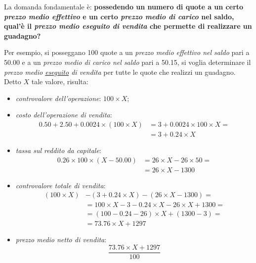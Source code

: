 \documentclass[12pt,a4paper]{article}
\newcommand{\Eur}[1]{\SI{#1}{\text{\euro{}}}}
\begin{document}

La domanda  fondamentale è:  \textbf{possedendo un  numero di  quote a  un certo  \emph{prezzo medio
      effettivo} e un  certo \emph{prezzo medio di  carico} nel saldo, qual'è  il \emph{prezzo medio
      eseguito di vendita} che permette di realizzare un guadagno?}

Per esempio,  si posseggano  \num{100} quote  a un \emph{prezzo  medio effettivo  nel saldo}  pari a
\Eur{50,00} e a un \emph{prezzo medio di carico nel saldo} pari a \Eur{50,15}, si voglia determinare
il \emph{prezzo medio \underline{eseguito} di vendita} per  tutte le quote che realizzi un guadagno.
Detto \(X\) tale valore, risulta:
\begin{itemize}
\item \emph{controvalore dell'operazione}: \(\num{100} \times{} X\);
\item \emph{costo dell'operazione di vendita}:
  \begin{align*}
    \num{0,50} + \num{2,50} + \num{0,0024} \times{} (\num{100} \times{} X)
    &= \num{3} + \num{0,0024} \times{} \num{100} \times{} X = \\
    &= \num{3} + \num{0,24} \times{} X
  \end{align*}
\item \emph{tassa sul reddito da capitale}:
  \begin{align*}
    \num{0,26} \times{} \num{100} \times{} (X - \num{50,00})
    &= \num{26} \times{} X - \num{26} \times{} \num{50} = \\
    &= \num{26} \times{} X - \num{1300}
  \end{align*}
\item \emph{controvalore totale di vendita}:
  \begin{align*}
    (\num{100} \times{} X)
    &- (\num{3} + \num{0,24} \times{} X)
      - (\num{26} \times{} X - \num{1300})
      = \\
    &= \num{100} \times{} X
      - \num{3} - \num{0,24} \times{} X
      - \num{26} \times{} X + \num{1300}
      = \\
    &= (\num{100} - \num{0,24} - \num{26}) \times{} X + (\num{1300} - \num{3})
      = \\
    &= \num{73,76} \times{} X + \num{1297}
  \end{align*}
\item \emph{prezzo medio netto di vendita}:
  \begin{equation*}
    \frac{\num{73,76} \times{} X + \num{1297}}{100}
  \end{equation*}
\end{itemize}
\end{document}
